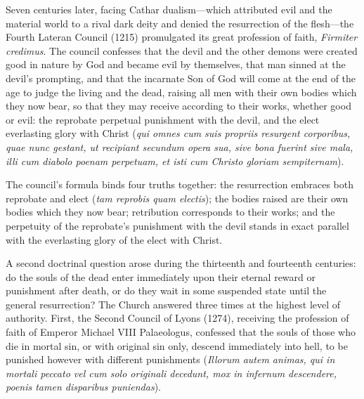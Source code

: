 Seven centuries later, facing Cathar dualism---which attributed evil and the material world to a rival dark deity and denied the resurrection of the flesh---the Fourth Lateran Council (1215) promulgated its great profession of faith, \textit{Firmiter credimus}. The council confesses that the devil and the other demons were created good in nature by God and became evil by themselves, that man sinned at the devil's prompting, and that the incarnate Son of God will come at the end of the age to judge the living and the dead, raising all men with their own bodies which they now bear, so that they may receive according to their works, whether good or evil: the reprobate perpetual punishment with the devil, and the elect everlasting glory with Christ (\textit{qui omnes cum suis propriis resurgent corporibus, quae nunc gestant, ut recipiant secundum opera sua, sive bona fuerint sive mala, illi cum diabolo poenam perpetuam, et isti cum Christo gloriam sempiternam}).

The council's formula binds four truths together: the resurrection embraces both reprobate and elect (\textit{tam reprobis quam electis}); the bodies raised are their own bodies which they now bear; retribution corresponds to their works; and the perpetuity of the reprobate's punishment with the devil stands in exact parallel with the everlasting glory of the elect with Christ.

A second doctrinal question arose during the thirteenth and fourteenth centuries: do the souls of the dead enter immediately upon their eternal reward or punishment after death, or do they wait in some suspended state until the general resurrection? The Church answered three times at the highest level of authority. First, the Second Council of Lyons (1274), receiving the profession of faith of Emperor Michael VIII Palaeologus, confessed that the souls of those who die in mortal sin, or with original sin only, descend immediately into hell, to be punished however with different punishments (\textit{Illorum autem animas, qui in mortali peccato vel cum solo originali decedunt, mox in infernum descendere, poenis tamen disparibus puniendas}).

